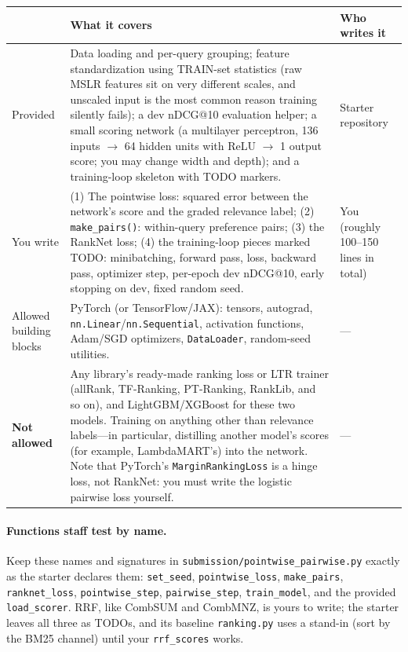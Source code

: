 \documentclass[10pt]{article}
\begin{document}
\begin{center}
\small
\begin{tabular}{|p{2.6cm}|p{8.6cm}|p{3.2cm}|}
\hline
 & \textbf{What it covers} & \textbf{Who writes it}\\
\hline
Provided &
Data loading and per-query grouping; feature standardization using TRAIN-set statistics (raw MSLR features sit on very different scales, and unscaled input is the most common reason training silently fails); a dev nDCG@10 evaluation helper; a small scoring network (a multilayer perceptron, 136 inputs \(\to\) 64 hidden units with ReLU \(\to\) 1 output score; you may change width and depth); and a training-loop skeleton with TODO markers. &
Starter repository\\
\hline
You write &
(1) The pointwise loss: squared error between the network's score and the graded relevance label; (2) \texttt{make\_pairs()}: within-query preference pairs; (3) the RankNet loss; (4) the training-loop pieces marked TODO: minibatching, forward pass, loss, backward pass, optimizer step, per-epoch dev nDCG@10, early stopping on dev, fixed random seed. &
You (roughly 100--150 lines in total)\\
\hline
Allowed building blocks &
PyTorch (or TensorFlow/JAX): tensors, autograd, \texttt{nn.Linear}/\texttt{nn.Sequential}, activation functions, Adam/SGD optimizers, \texttt{DataLoader}, random-seed utilities. &
---\\
\hline
\textbf{Not allowed} &
Any library's ready-made ranking loss or LTR trainer (allRank, TF-Ranking, PT-Ranking, RankLib, and so on), and LightGBM/XGBoost for these two models. Training on anything other than relevance labels---in particular, distilling another model's scores (for example, LambdaMART's) into the network. Note that PyTorch's \texttt{MarginRankingLoss} is a hinge loss, not RankNet: you must write the logistic pairwise loss yourself. &
---\\
\hline
\end{tabular}
\end{center}

\paragraph{Functions staff test by name.}
Keep these names and signatures in \texttt{submission/pointwise\_pairwise.py} exactly as the starter declares them: \texttt{set\_seed}, \texttt{pointwise\_loss}, \texttt{make\_pairs}, \texttt{ranknet\_loss}, \texttt{pointwise\_step}, \texttt{pairwise\_step}, \texttt{train\_model}, and the provided \texttt{load\_scorer}. RRF, like CombSUM and CombMNZ, is yours to write; the starter leaves all three as TODOs, and its baseline \texttt{ranking.py} uses a stand-in (sort by the BM25 channel) until your \texttt{rrf\_scores} works.
\end{document}
